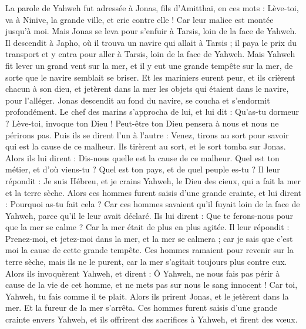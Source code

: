 \begin{multicols}{2}
\VerseOne{}La parole de Yahweh fut adressée à Jonas, fils d'Amitthaï, en ces mots :
Lève-toi, va à Ninive, la grande ville, et crie contre elle ! Car leur malice est montée jusqu'à moi.
Mais Jonas se leva pour s'enfuir à Tarsis, loin de la face de Yahweh. Il descendit à Japho, où il trouva un navire qui allait à Tarsis ; il paya le prix du transport et y entra pour aller à Tarsis, loin de la face de Yahweh.
Mais Yahweh fit lever un grand vent sur la mer, et il y eut une grande tempête sur la mer, de sorte que le navire semblait se briser.
Et les mariniers eurent peur, et ils crièrent chacun à son dieu, et jetèrent dans la mer les objets qui étaient dans le navire, pour l’alléger. Jonas descendit au fond du navire, se coucha et s’endormit profondément.
Le chef des marins s'approcha de lui, et lui dit : Qu’as-tu dormeur ? Lève-toi, invoque ton Dieu ! Peut-être ton Dieu pensera à nous et nous ne périrons pas.
Puis ils se dirent l'un à l'autre : Venez, tirons au sort pour savoir qui est la cause de ce malheur. Ils tirèrent au sort, et le sort tomba sur Jonas.
Alors ils lui dirent : Dis-nous quelle est la cause de ce malheur. Quel est ton métier, et d'où viens-tu ? Quel est ton pays, et de quel peuple es-tu ?
Il leur répondit : Je suis Hébreu, et je crains Yahweh, le Dieu des cieux, qui a fait la mer et la terre sèche.
Alors ces hommes furent saisis d'une grande crainte, et lui dirent : Pourquoi as-tu fait cela ? Car ces hommes savaient qu’il fuyait loin de la face de Yahweh, parce qu'il le leur avait déclaré.
Ils lui dirent : Que te ferons-nous pour que la mer se calme ? Car la mer était de plus en plus agitée.
Il leur répondit : Prenez-moi, et jetez-moi dans la mer, et la mer se calmera ; car je sais que c’est moi la cause de cette grande tempête.
Ces hommes ramaient pour revenir sur la terre sèche, mais ils ne le purent, car la mer s'agitait toujours plus contre eux.
Alors ils invoquèrent Yahweh, et dirent : Ô Yahweh, ne nous fais pas périr à cause de la vie de cet homme, et ne mets pas sur nous le sang innocent ! Car toi, Yahweh, tu fais comme il te plait.
Alors ils prirent Jonas, et le jetèrent dans la mer. Et la fureur de la mer s'arrêta.
Ces hommes furent saisis d’une grande crainte envers Yahweh, et ils offrirent des sacrifices à Yahweh, et firent des vœux.

\end{multicols}
